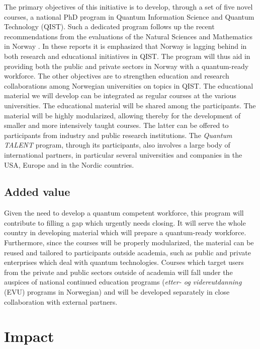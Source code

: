 \documentclass{scrreprt}
\begin{document}
The primary objectives of this initiative is to develop, through a set of five novel courses, a national PhD program in Quantum Information Science and Quantum Technology (QIST). Such a dedicated program follows up the recent recommendations from the evaluations of the Natural Sciences and Mathematics in Norway \cite{evalnat,evalmat}. In these reports it is emphasized that Norway is lagging behind in both research and educational initiatives in QIST. 
The program will thus aid in providing both the public and private sectors in Norway with a quantum-ready workforce. 
The other objectives are to strengthen education and research collaborations among Norwegian universities on topics in QIST. 
The educational material we will develop can be integrated as regular courses at the various universities. The educational material will be shared among the participants. The material will be highly modularized, allowing thereby for the development of smaller and more intensively taught courses. The   latter can be offered to participants from industry and public research institutions. 
The \textit{Quantum TALENT} program, through its participants, also involves a large body of international partners, in particular several universities and companies in the USA, Europe  and in the Nordic countries.

\subsection{Added value}


Given the need to develop a quantum competent workforce, this program will contribute to filling a gap which urgently needs closing.  
It will 
serve the whole country in developing material which will prepare a
quantum-ready workforce. Furthermore, since the courses will be
properly modularized, the material can be reused and tailored to
participants outside academia, such as public and private enterprises
which deal with quantum technologies. Courses which target users from
the private and public sectors outside of academia will fall under the
auspices of national continued education programs (\textit{etter- og videreutdanning} (EVU)
programs in Norwegian) and will be developed separately in close
collaboration with external partners.

\section{Impact}
\end{document}
